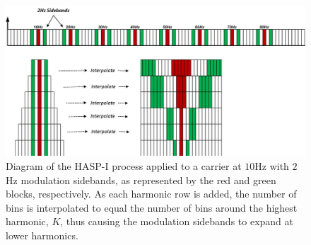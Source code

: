\begin{figure}[tp]
	\includegraphics[width=\textwidth]{./misc_graphics/haspi_diagram_modulation.jpg}
	\centering
	\caption{Diagram of the HASP-I process applied to a carrier at $10$Hz with $2$Hz modulation sidebands, as represented by the red and green blocks, respectively.  As each harmonic row is added, the number of bins is interpolated to equal the number of bins around the highest harmonic, $K$, thus causing the modulation sidebands to expand at lower harmonics.}
	\label{fig:haspi_diagram_modulation}
\end{figure}
